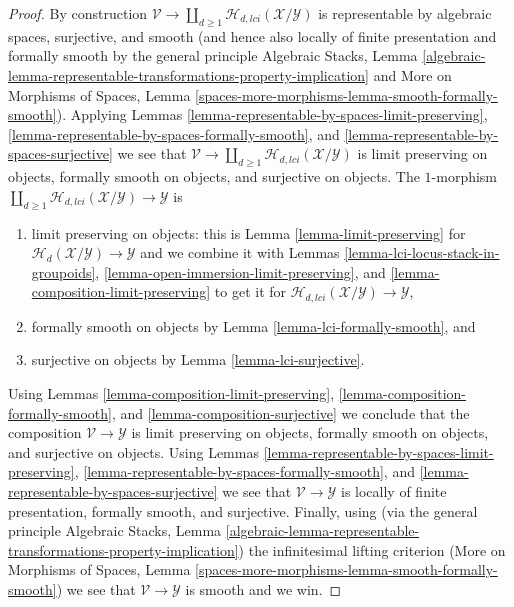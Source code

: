 \begin{proof}
\medskip\noindent
By construction $\mathcal{V} \to
\coprod\nolimits_{d \geq 1} \mathcal{H}_{d, lci}(\mathcal{X}/\mathcal{Y})$
is representable by algebraic spaces, surjective, and smooth (and hence
also locally of finite presentation and formally smooth by the general
principle
Algebraic Stacks, Lemma
\ref{algebraic-lemma-representable-transformations-property-implication}
and
More on Morphisms of Spaces,
Lemma \ref{spaces-more-morphisms-lemma-smooth-formally-smooth}).
Applying
Lemmas \ref{lemma-representable-by-spaces-limit-preserving},
\ref{lemma-representable-by-spaces-formally-smooth}, and
\ref{lemma-representable-by-spaces-surjective}
we see that $\mathcal{V} \to
\coprod\nolimits_{d \geq 1} \mathcal{H}_{d, lci}(\mathcal{X}/\mathcal{Y})$
is limit preserving on objects, formally smooth on objects, and
surjective on objects. The $1$-morphism
$\coprod\nolimits_{d \geq 1} \mathcal{H}_{d, lci}(\mathcal{X}/\mathcal{Y})
\to \mathcal{Y}$ is
\begin{enumerate}
\item limit preserving on objects: this is
Lemma \ref{lemma-limit-preserving}
for $\mathcal{H}_d(\mathcal{X}/\mathcal{Y}) \to \mathcal{Y}$
and we combine it with Lemmas
\ref{lemma-lci-locus-stack-in-groupoids},
\ref{lemma-open-immersion-limit-preserving}, and
\ref{lemma-composition-limit-preserving}
to get it for $\mathcal{H}_{d, lci}(\mathcal{X}/\mathcal{Y}) \to \mathcal{Y}$,
\item formally smooth on objects by
Lemma \ref{lemma-lci-formally-smooth},
and
\item surjective on objects by
Lemma \ref{lemma-lci-surjective}.
\end{enumerate}
Using
Lemmas \ref{lemma-composition-limit-preserving},
\ref{lemma-composition-formally-smooth}, and
\ref{lemma-composition-surjective}
we conclude that the composition $\mathcal{V} \to \mathcal{Y}$ is
limit preserving on objects, formally smooth on objects, and
surjective on objects.
Using
Lemmas \ref{lemma-representable-by-spaces-limit-preserving},
\ref{lemma-representable-by-spaces-formally-smooth}, and
\ref{lemma-representable-by-spaces-surjective}
we see that $\mathcal{V} \to \mathcal{Y}$ is
locally of finite presentation, formally smooth, and surjective.
Finally, using (via the general principle
Algebraic Stacks,
Lemma \ref{algebraic-lemma-representable-transformations-property-implication})
the infinitesimal lifting criterion
(More on Morphisms of Spaces, Lemma
\ref{spaces-more-morphisms-lemma-smooth-formally-smooth})
we see that $\mathcal{V} \to \mathcal{Y}$ is smooth and we win.
\end{proof}








